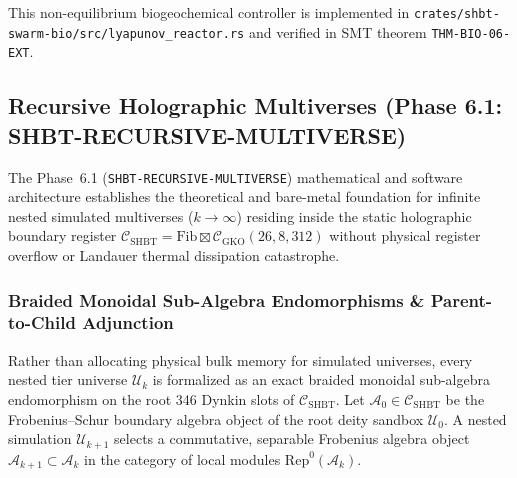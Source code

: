 \documentclass[11pt,onecolumn]{article}
\begin{document}
This non-equilibrium biogeochemical controller is implemented in \texttt{crates/shbt-swarm-bio/src/lyapunov\_reactor.rs} and verified in SMT theorem \texttt{THM-BIO-06-EXT}.

\FloatBarrier


\subsection{Recursive Holographic Multiverses (Phase 6.1: SHBT-RECURSIVE-MULTIVERSE)}
\label{sec:recursive_multiverse}
The Phase~6.1 (\texttt{SHBT-RECURSIVE-MULTIVERSE}) mathematical and software architecture establishes the theoretical and bare-metal foundation for infinite nested simulated multiverses ($k \to \infty$) residing inside the static holographic boundary register $\mathcal{C}_{\text{SHBT}} = \text{Fib} \boxtimes \mathcal{C}_{\text{GKO}}(26, 8, 312)$ without physical register overflow or Landauer thermal dissipation catastrophe.

\subsubsection{Braided Monoidal Sub-Algebra Endomorphisms \& Parent-to-Child Adjunction}
Rather than allocating physical bulk memory for simulated universes, every nested tier universe $\mathcal{U}_k$ is formalized as an exact braided monoidal sub-algebra endomorphism on the root 346 Dynkin slots of $\mathcal{C}_{\text{SHBT}}$. Let $\mathcal{A}_0 \in \mathcal{C}_{\text{SHBT}}$ be the Frobenius--Schur boundary algebra object of the root deity sandbox $\mathcal{U}_0$. A nested simulation $\mathcal{U}_{k+1}$ selects a commutative, separable Frobenius algebra object $\mathcal{A}_{k+1} \subset \mathcal{A}_k$ in the category of local modules $\mathrm{Rep}^0(\mathcal{A}_k)$.
\end{document}
